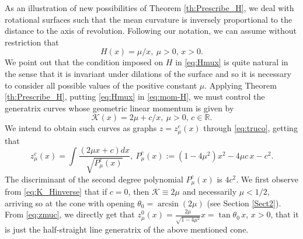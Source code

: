 \documentclass[leqno,11pt]{amsart}
\def\R{\mathbb{R}}
\theoremstyle{definition}
\numberwithin{equation}{section}
\begin{document}
As an illustration of new possibilities of Theorem \ref{th:Prescribe_H}, we deal with rotational surfaces such that the mean curvature is  inversely proportional to the distance to the axis of revolution. Following our notation, we can assume without restriction that  
\begin{equation}\label{eq:Hmux}
H(x)=\mu/x, \ \mu>0, \, x>0.
\end{equation}
We point out that the condition imposed on $H$ in \eqref{eq:Hmux} is quite natural in the sense that it is invariant under dilations of the surface and so it is necessary to consider all possible values of the positive constant $\mu$. Applying Theorem \ref{th:Prescribe_H}, putting \eqref{eq:Hmux} in \eqref{eq:mom-H}, we must control the generatrix curves whose geometric linear momentum is given by
\begin{equation}\label{eq:K_Hinverse}
	\mathcal K(x)=2\mu+c/x, \ \mu >0, \, c\in \R.
\end{equation}
We intend to obtain such curves as graphs $z=z_\mu^c(x)$ through \eqref{eq:truco}, getting that
\begin{equation}\label{eq:zmuc}
z_\mu^c(x)=\int \frac{(2\mu x+c)dx}{\sqrt{P_\mu^c(x)}}, \  P_\mu^c(x):=(1-4\mu^2)x^2-4\mu c\, x - c^2.
\end{equation}
The discriminant of the second degree polynomial $P_\mu^c(x)$ is $4c^2$.
We first observe from \eqref{eq:K_Hinverse} that if $c=0$, then $\mathcal K \equiv 2\mu$ and necessarily $\mu <1/2$, arriving so at the cone with opening $\theta_0 = \arcsin (2\mu)$ (see Section \ref{Sect2}). From \eqref{eq:zmuc}, we directly get that $z_\mu^0(x)=\frac{2\mu}{\sqrt{1-4\mu^2}}x=\tan \theta_0 \, x$, $x>0$, that it is just the half-straight line generatrix of the above mentioned cone. 
\end{document}
